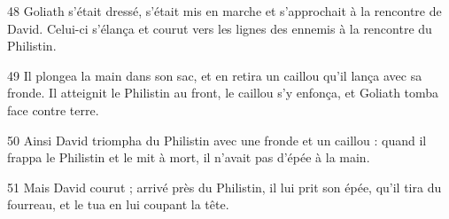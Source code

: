 

48 Goliath s’était dressé, s’était mis en marche et s’approchait à la rencontre de David. Celui-ci s’élança et courut vers les lignes des ennemis à la rencontre du Philistin.

49 Il plongea la main dans son sac, et en retira un caillou qu’il lança avec sa fronde. Il atteignit le Philistin au front, le caillou s’y enfonça, et Goliath tomba face contre terre.

50 Ainsi David triompha du Philistin avec une fronde et un caillou : quand il frappa le Philistin et le mit à mort, il n’avait pas d’épée à la main.

51 Mais David courut ; arrivé près du Philistin, il lui prit son épée, qu’il tira du fourreau, et le tua en lui coupant la tête.